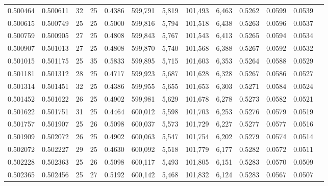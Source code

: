 \begin{tabular}{rrrrrrrrrrrrr}
0.500464 & 0.500611 &    32 &  25 &                                     0.4386 & 599,791 &   5,819 & 101,493 &   6,463 & 0.5262 & 0.0599 & 0.0539 \\
0.500615 & 0.500749 &    25 &  25 &                                     0.5000 & 599,816 &   5,794 & 101,518 &   6,438 & 0.5263 & 0.0596 & 0.0537 \\
0.500759 & 0.500905 &    27 &  25 &                                     0.4808 & 599,843 &   5,767 & 101,543 &   6,413 & 0.5265 & 0.0594 & 0.0534 \\
0.500907 & 0.501013 &    27 &  25 &                                     0.4808 & 599,870 &   5,740 & 101,568 &   6,388 & 0.5267 & 0.0592 & 0.0532 \\
0.501015 & 0.501175 &    25 &  35 &                                     0.5833 & 599,895 &   5,715 & 101,603 &   6,353 & 0.5264 & 0.0588 & 0.0529 \\
0.501181 & 0.501312 &    28 &  25 &                                     0.4717 & 599,923 &   5,687 & 101,628 &   6,328 & 0.5267 & 0.0586 & 0.0527 \\
0.501314 & 0.501451 &    32 &  25 &                                     0.4386 & 599,955 &   5,655 & 101,653 &   6,303 & 0.5271 & 0.0584 & 0.0524 \\
0.501452 & 0.501622 &    26 &  25 &                                     0.4902 & 599,981 &   5,629 & 101,678 &   6,278 & 0.5273 & 0.0582 & 0.0521 \\
0.501622 & 0.501751 &    31 &  25 &                                     0.4464 & 600,012 &   5,598 & 101,703 &   6,253 & 0.5276 & 0.0579 & 0.0519 \\
0.501757 & 0.501907 &    25 &  26 &                                     0.5098 & 600,037 &   5,573 & 101,729 &   6,227 & 0.5277 & 0.0577 & 0.0516 \\
0.501909 & 0.502072 &    26 &  25 &                                     0.4902 & 600,063 &   5,547 & 101,754 &   6,202 & 0.5279 & 0.0574 & 0.0514 \\
0.502072 & 0.502227 &    29 &  25 &                                     0.4630 & 600,092 &   5,518 & 101,779 &   6,177 & 0.5282 & 0.0572 & 0.0511 \\
0.502228 & 0.502363 &    25 &  26 &                                     0.5098 & 600,117 &   5,493 & 101,805 &   6,151 & 0.5283 & 0.0570 & 0.0509 \\
0.502365 & 0.502456 &    25 &  27 &                                     0.5192 & 600,142 &   5,468 & 101,832 &   6,124 & 0.5283 & 0.0567 & 0.0507 \\

\end{tabular}
